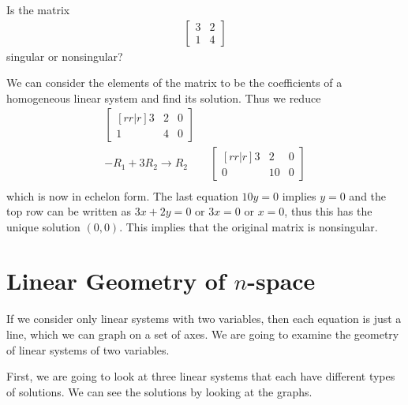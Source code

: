 \begin{example}
Is the matrix
%
\begin{align*} \begin{bmatrix}
3 & 2 \\
1 & 4
\end{bmatrix}
\end{align*}
singular or nonsingular?

\solution

We can consider the elements of the matrix to be the coefficients of a homogeneous linear system and find its solution.  Thus we reduce
%
\begin{align*}
\begin{bmatrix}[rr|r]
3 & 2 & 0 \\
1 & 4 & 0
\end{bmatrix} \\
-R_1 + 3R_2 \rightarrow R_2 \qquad
\begin{bmatrix}[rr|r]
3 & 2 & 0 \\
0 & 10 & 0
\end{bmatrix} \\
\end{align*}
which is now in echelon form.  The last equation $10y=0$ implies $y=0$ and the top row can be written as $3x+2y=0$ or $3x=0$ or $x=0$, thus this has the unique solution $(0,0)$.  This implies that the original matrix is nonsingular.
\end{example}


\vfill \pagebreak


\section{Linear Geometry of \texorpdfstring{$n$}{n}-space} \label{sect:linear:geom}

If we consider only linear systems with two variables, then each equation is just a line, which we can graph on a set of axes. We are going to examine the geometry of linear systems of two variables.

First, we are going to look at three linear systems that each have different types of solutions.  We can see the solutions by looking at the graphs.


